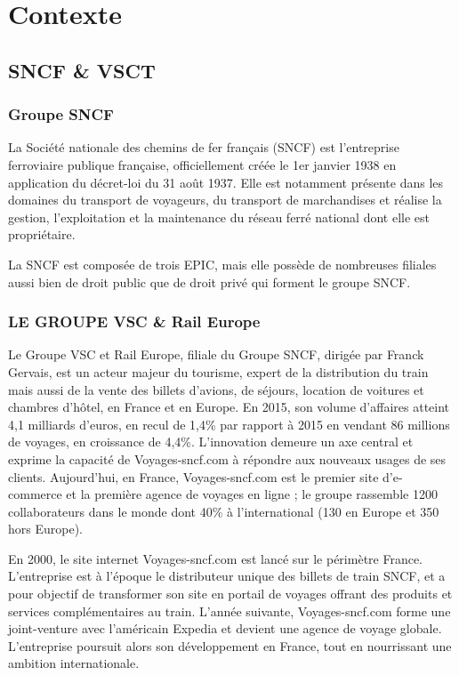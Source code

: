 \chapter{Contexte}

\section{SNCF \& VSCT}
\subsection{Groupe SNCF}
La Société nationale des chemins de fer français (SNCF) est l'entreprise ferroviaire publique française, officiellement créée le 1er janvier 1938 en application du décret-loi du 31 août 1937. Elle est notamment présente dans les domaines du transport de voyageurs, du transport de marchandises et réalise la gestion, l'exploitation et la maintenance du réseau ferré national dont elle est propriétaire.

La SNCF est composée de trois EPIC, mais elle possède de nombreuses filiales aussi bien de droit public que de droit privé qui forment le groupe SNCF.
\clearpage

\subsection{LE GROUPE VSC \& Rail Europe}
Le Groupe VSC et Rail Europe, filiale du Groupe SNCF, dirigée par Franck Gervais, est un acteur majeur du tourisme, expert de la distribution du train mais aussi de la vente des billets d'avions, de séjours, location de voitures et chambres d'hôtel, en France et en Europe. En 2015, son volume d’affaires atteint 4,1 milliards d’euros, en recul de 1,4\% par rapport à 2015 en vendant 86 millions de voyages, en croissance de 4,4\%. L’innovation demeure un axe central et exprime la capacité de Voyages-sncf.com à répondre aux nouveaux usages de ses clients. Aujourd’hui, en France, Voyages-sncf.com est le premier site d’e-commerce et la première agence de voyages en ligne ; le groupe rassemble 1200 collaborateurs dans le monde dont 40\% à l'international (130 en Europe et 350 hors Europe).

En 2000, le site internet Voyages-sncf.com est lancé sur le périmètre France. L’entreprise est à l’époque le distributeur unique des billets de train SNCF, et a pour objectif de transformer son site en portail de voyages offrant des produits et services complémentaires au train. L’année suivante, Voyages-sncf.com forme une joint-venture avec l’américain Expedia et devient une agence de voyage globale. L’entreprise poursuit alors son développement en France, tout en nourrissant une ambition internationale.

